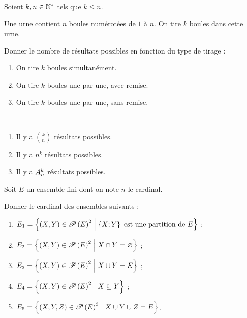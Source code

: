 \begin{exoex}
Soient \(k,n\in\Ns\) tels que \(k\leq n\).

Une urne contient \(n\) boules numérotées de \(1\) à \(n\). On tire \(k\) boules dans cette urne.

Donner le nombre de résultats possibles en fonction du type de tirage :

\begin{enumerate}
    \item On tire \(k\) boules simultanément. \\
    \item On tire \(k\) boules une par une, avec remise. \\
    \item On tire \(k\) boules une par une, sans remise.
\end{enumerate}
\end{exoex}

\begin{corr}~\\
\begin{enumerate}
    \item Il y a \(\binom{k}{n}\) résultats possibles. \\
    \item Il y a \(n^k\) résultats possibles. \\
    \item Il y a \(\arr{k}{n}\) résultats possibles.
\end{enumerate}
\end{corr}

\begin{exoex}
Soit \(E\) un ensemble fini dont on note \(n\) le cardinal.

Donner le cardinal des ensembles suivants :

\begin{enumerate}
    \item \(E_1=\accol{\paren{X,Y}\in\P{E}^2\tq\accol{X;Y}\text{ est une partition de }E}\) ; \\
    \item \(E_2=\accol{\paren{X,Y}\in\P{E}^2\tq X\inter Y=\ensvide}\) ; \\
    \item \(E_3=\accol{\paren{X,Y}\in\P{E}^2\tq X\union Y=E}\) ; \\
    \item \(E_4=\accol{\paren{X,Y}\in\P{E}^2\tq X\subset Y}\) ; \\
    \item \(E_5=\accol{\paren{X,Y,Z}\in\P{E}^3\tq X\union Y\union Z=E}\).
\end{enumerate}
\end{exoex}

